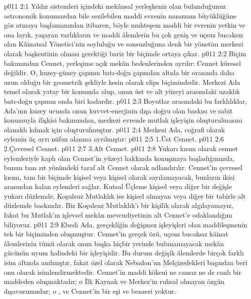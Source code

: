 \vs p011 2:1 Yıldız sistemleri içindeki mekânsal yerleşkeniz olan bulunduğunuz astronomik konumuzdan bile sezilebilen maddi evrenin muazzam büyüklüğüne göz atmaya başlamanızdan itibaren, böyle muhteşem maddi bir evrenin yetkin ve ona layık, yaşayan varlıkların ve maddi âlemlerin bu çok geniş ve uçsuz bucaksız olan Kâinatsal Yönetici’nin soyluluğu ve sonsuzluğuna denk bir yönetim merkezi olarak başkentinin olması gerektiği bariz bir biçimde ortaya çıkar.
\vs p011 2:2 Biçim bakımından Cennet, yerleşime açık mekân bedenlerinden ayrılır: Cennet küresel değildir. O, kuzey\hyp{}güney çapının batı\hyp{}doğu çapından altıda bir oranında daha uzun olduğu bir geometrik şekliyle kesin olarak elips biçimindedir. Merkezi Ada temel olarak yatay bir konumda olup, onun üst ve alt yüzeyi arasındaki uzaklık batı\hyp{}doğu çapının onda biri kadardır.
\vs p011 2:3 Boyutlar arasındaki bu farklılıklar, Ada’nın kuzey ucunda onun kuvvet\hyp{}enerjinin dışa doğru olan baskısı ve sabit konumuyla ilişkisi bakımından, merkezi evrende mutlak işleyişin oluşturulmasını olanaklı kılmak için oluşturulmuştur.
\vs p011 2:4 Merkezi Ada, coğrafi olarak eylemin üç ayrı nüfuz alanına ayrılmıştır:
\vs p011 2:5 1.\bibnobreakspace Üst Cennet.
\vs p011 2:6 2.\bibnobreakspace Çevresel Cennet.
\vs p011 2:7 3.\bibnobreakspace Alt Cennet.
\vs p011 2:8 Yukarı kısım olarak cennet eylemleriyle kaplı olan Cennet’in yüzeyi hakkında konuşmaya başladığımızda, bunun tam zıt yönündeki taraf alt Cennet olarak adlandırılır. Cennet’in çevresel kısmı, tam bir biçimde kişisel veya kişisel olarak sayılamayacak, bunların ikisi arasından kalan eylemleri sağlar. Kutsal Üçleme kişisel veya diğer bir değişle yukarı düzlemde, Koşulsuz Mutlaklık ise kişisel olmayan veya diğer bir tabirle alt düzlemde baskındır. Biz Koşulsuz Mutlaklık’ı bir kişilik olarak algılayamayız, fakat bu Mutlak’ın işlevsel mekân mevcudiyetinin alt Cennet’e odaklandığını biliyoruz.
\vs p011 2:9 Ebedi Ada, gerçekliğin değişmez işleyişleri olan maddileşmenin tek bir biçiminden oluşmuştur. Cennet’in gerçek özü, uçsuz bucaksız kâinat âlemlerinin tümü olarak onun başka hiçbir yerinde bulunamayacak mekân gücünün uyum halindeki bir işleyişidir. Bu durum değişik âlemlerde birçok farklı isim altında anılmıştır, fakat özel olarak Nebadon’un Melçizedekleri başından beri onu  olarak isimlendirmektedir. Cennet’in maddi kökeni ne cansız ne de canlı bir maddeden oluşmaktadır; o İlk Kaynak ve Merkez’in ruhsal olmayan özgün dışavurumudur; o , ve Cennet’in bir eşi ve benzeri yoktur.
